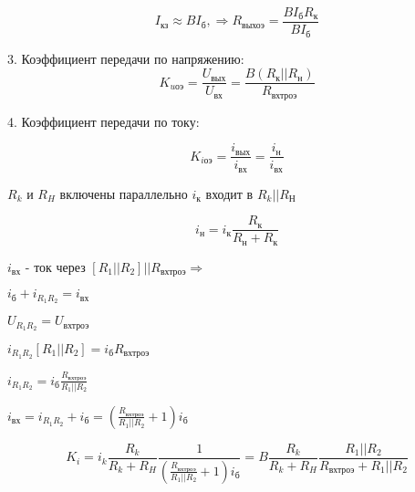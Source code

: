 $$
I_\textit{кз}\approx BI_\textit{б},\Rightarrow R_\textit{выхоэ}=\frac{BI_\textit{б}R_\textit{к}}{BI_\textit{б}}
$$

3. Коэффициент передачи по напряжению:
$$
K_\textit{uоэ}=\frac{U_\textit{вых}}{U_\textit{вх}}=\frac{B(R_\textit{к}||R_\textit{н})}{R_\textit{вхтроэ}}
$$

4. Коэффициент передачи по току:

$$K_\textit{iоэ}=\frac{i_\textit{вых}}{i_\textit{вх}}=\frac{i_\textit{н}}{i_\textit{вх}}$$

$R_k \textit{ и } R_H$ включены параллельно $i_\textit{к}$ входит в $R_\textit{k}||R_\textit{Н}$

$$i_\textit{н}=i_\textit{к}\frac{R_\textit{к}}{R_\textit{н}+R_\textit{к}}$$

$i_\textit{вх}$ - ток через $[R_1||R_2]||R_\textit{вхтроэ}\Rightarrow$

$i_\textit{б}+i_{R_1R_2}=i_\textit{вх}$

$U_{R_1R_2}=U_\textit{вхтроэ}$

$i_{R_1R_2}[R_1||R_2]=i_\textit{б}R_\textit{вхтроэ}$

$i_{R_1R_2}=i_\textit{б}\frac{R_\textit{вхтроэ}}{R_1||R_2}$

$i_\textit{вх}=i_{R_1R_2}+i_\textit{б}=\left(\frac{R_\textit{вхтроэ}}{R_1||R_2}+1\right)i_\textit{б}$

$$K_i=i_k\frac{R_k}{R_k+R_H}\frac{1}{\left(\frac{R_\textit{вхтроэ}}{R_1||R_2}+1\right)i_\textit{б}}=B\frac{R_k}{R_k+R_H}\frac{R_1||R_2}{R_\textit{вхтроэ}+R_1||R_2}
$$

\pagebreak

